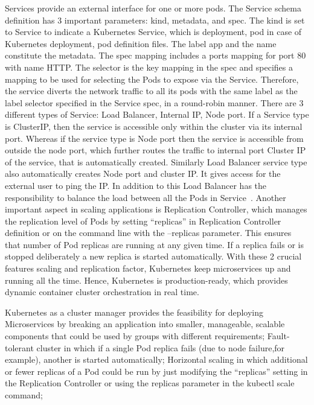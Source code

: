 Services provide an external interface for one or more pods. The
Service schema definition has 3 important parameters: kind, metadata,
and spec. The kind is set to Service to indicate a Kubernetes Service,
which is deployment, pod in case of Kubernetes deployment, pod
definition files. The label app and the name constitute the
metadata. The spec mapping includes a ports mapping for port 80 with
name HTTP. The selector is the key mapping in the spec and specifies a
mapping to be used for selecting the Pods to expose via the
Service. Therefore, the service diverts the network traffic to all its
pods with the same label as the label selector specified in the
Service spec, in a round-robin manner. There are 3 different types of
Service: Load Balancer, Internal IP, Node port. If a Service type is
ClusterIP, then the service is accessible only within the cluster via
its internal port. Whereas if the service type is Node port then the
service is accessible from outside the node port, which further routes
the traffic to internal port Cluster IP of the service, that is
automatically created. Similarly Load Balancer service type also
automatically creates Node port and cluster IP. It gives access for
the external user to ping the IP. In addition to this Load Balancer
has the responsibility to balance the load between all the Pods in
Service~\cite{hid-sp18-602-services}.  Another important aspect in
scaling applications is Replication Controller, which manages the
replication level of Pods by setting “replicas” in Replication
Controller definition or on the command line with the –replicas
parameter. This ensures that number of Pod replicas are running at any
given time. If a replica fails or is stopped deliberately a new
replica is started automatically. With these 2 crucial features
scaling and replication factor, Kubernetes keep microservices up and
running all the time. Hence, Kubernetes is production-ready, which
provides dynamic container cluster orchestration in real time.

Kubernetes as a cluster manager provides the feasibility for deploying
Microservices by breaking an application into smaller, manageable,
scalable components that could be used by groups with different
requirements; Fault-tolerant cluster in which if a single Pod replica
fails (due to node failure,for example), another is started
automatically; Horizontal scaling in which additional or fewer
replicas of a Pod could be run by just modifying the “replicas”
setting in the Replication Controller or using the replicas parameter
in the kubectl scale command;

